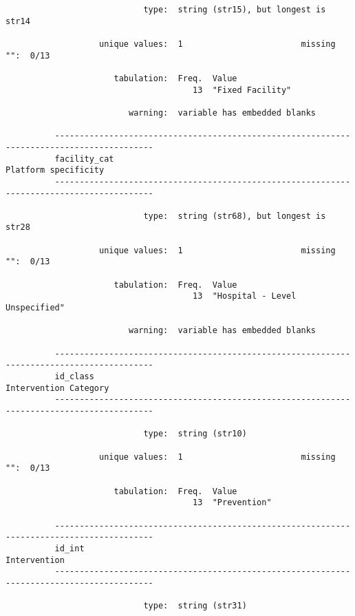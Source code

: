 \documentclass{article}
\begin{document}
\begin{verbatim}
                            type:  string (str15), but longest is str14
          
                   unique values:  1                        missing "":  0/13
          
                      tabulation:  Freq.  Value
                                      13  "Fixed Facility"
          
                         warning:  variable has embedded blanks
          
          ------------------------------------------------------------------------------------------
          facility_cat                                                          Platform specificity
          ------------------------------------------------------------------------------------------
          
                            type:  string (str68), but longest is str28
          
                   unique values:  1                        missing "":  0/13
          
                      tabulation:  Freq.  Value
                                      13  "Hospital - Level Unspecified"
          
                         warning:  variable has embedded blanks
          
          ------------------------------------------------------------------------------------------
          id_class                                                             Intervention Category
          ------------------------------------------------------------------------------------------
          
                            type:  string (str10)
          
                   unique values:  1                        missing "":  0/13
          
                      tabulation:  Freq.  Value
                                      13  "Prevention"
          
          ------------------------------------------------------------------------------------------
          id_int                                                                        Intervention
          ------------------------------------------------------------------------------------------
          
                            type:  string (str31)
          

\end{verbatim}
\end{document}
